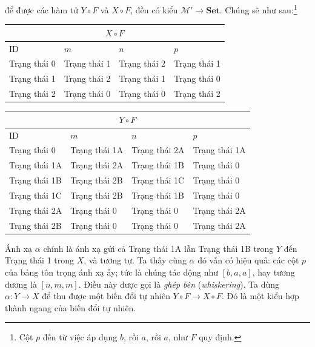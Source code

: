 để được các hàm tử $Y\circ F$ và $X\circ F$, đều có kiểu $\mathcal M'\to\mathbf{Set}$. Chúng sẽ như sau:\footnote{Cột $p$ đến từ việc áp dụng $b$, rồi $a$, rồi $a$, như $F$ quy định.}
\begin{center}\footnotesize\setlength{\tabcolsep}{3pt}
\begin{tabular}{|l|l|l|l|}\hline\multicolumn{4}{|c|}{$X\circ F$}\\\hline ID&$m$&$n$&$p$\\\hline Trạng thái 0&Trạng thái 1&Trạng thái 2&Trạng thái 1\\Trạng thái 1&Trạng thái 2&Trạng thái 1&Trạng thái 0\\Trạng thái 2&Trạng thái 0&Trạng thái 0&Trạng thái 2\\\hline\end{tabular}

\medskip
\begin{tabular}{|l|l|l|l|}\hline\multicolumn{4}{|c|}{$Y\circ F$}\\\hline ID&$m$&$n$&$p$\\\hline Trạng thái 0&Trạng thái 1A&Trạng thái 2A&Trạng thái 1A\\Trạng thái 1A&Trạng thái 2A&Trạng thái 1B&Trạng thái 0\\Trạng thái 1B&Trạng thái 2B&Trạng thái 1C&Trạng thái 0\\Trạng thái 1C&Trạng thái 2B&Trạng thái 1B&Trạng thái 0\\Trạng thái 2A&Trạng thái 0&Trạng thái 0&Trạng thái 2A\\Trạng thái 2B&Trạng thái 0&Trạng thái 0&Trạng thái 2A\\\hline\end{tabular}
\end{center}
Ánh xạ $\alpha$ chính là ánh xạ gửi cả Trạng thái 1A lẫn Trạng thái 1B trong $Y$ đến Trạng thái 1 trong $X$, và tương tự. Ta thấy cùng $\alpha$ đó vẫn có hiệu quả: các cột $p$ của bảng tôn trọng ánh xạ ấy; tức là chúng tác động như $[b,a,a]$, hay tương đương là $[n,m,m]$. Điều này được gọi là \emph{ghép bên} (\emph{whiskering}). Ta dùng $\alpha:Y\to X$ để thu được một biến đổi tự nhiên $Y\circ F\to X\circ F$. Đó là một kiểu hợp thành ngang của biến đổi tự nhiên.
